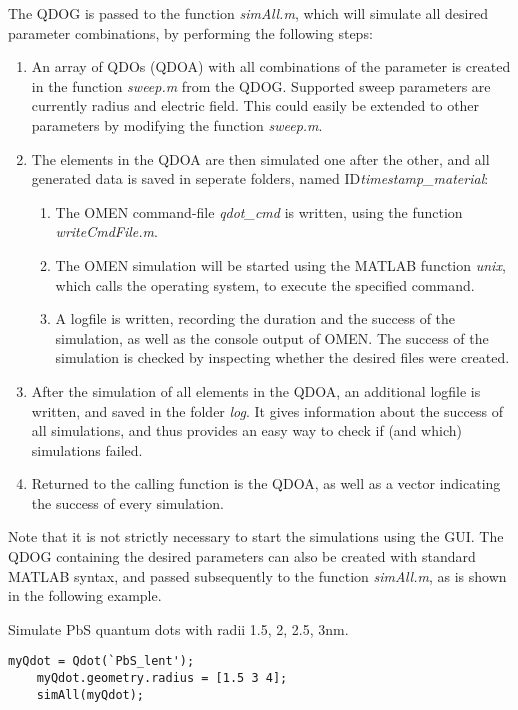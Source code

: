 The QDOG is passed to the function \textit{simAll.m}, which will simulate all desired parameter combinations, by performing the following steps:
\begin{enumerate}
	\item An array of QDOs (QDOA) with all combinations of the parameter is created in the function \textit{sweep.m} from the QDOG. Supported sweep parameters are currently radius and electric field. This could easily be extended to other parameters by modifying the function \textit{sweep.m}.
	\item The elements in the QDOA are then simulated one after the other, and all generated data is saved in seperate folders, named ID\textit{timestamp\_material}: 
	\begin{enumerate}
		\item The OMEN command-file \textit{qdot\_cmd} is written, using the function \textit{writeCmdFile.m}.
		\item The OMEN simulation will be started using the MATLAB function \textit{unix}, which calls the operating system, to execute the specified command.
		\item A logfile is written, recording the duration and the success of the simulation, as well as the console output of OMEN. The success of the simulation is checked by inspecting whether the desired files were created.
	\end{enumerate}
\item After the simulation of all elements in the QDOA, an additional logfile is written, and saved in the folder \textit{log}. It gives information about the success of all simulations, and thus provides an easy way to check if (and which) simulations failed.
\item Returned to the calling function is the QDOA, as well as a vector indicating the success of every simulation.
\end{enumerate}

Note that it is not strictly necessary to start the simulations using the GUI. The QDOG containing the desired parameters can also be created with standard MATLAB syntax, and passed subsequently to the function \textit{simAll.m}, as is shown in the following example.\\

\begin{EXAMPLE} Simulate PbS  quantum dots with radii 1.5, 2, 2.5, 3nm. 
\begin{lstlisting}[frame = none]
	myQdot = Qdot(`PbS_lent');
	myQdot.geometry.radius = [1.5 3 4]; 
	simAll(myQdot);\end{lstlisting}
\end{EXAMPLE}


